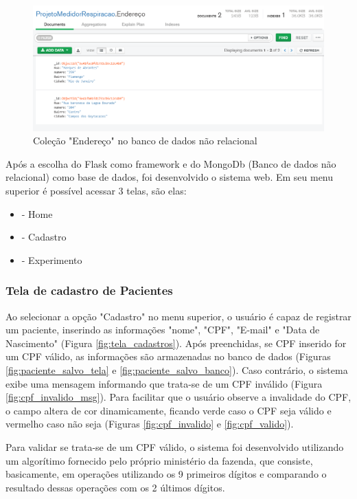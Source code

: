 \begin{figure}[h!]
	\begin{center}
		\includegraphics[width=0.8\linewidth]{images/bd_nao_relacional_Endereco.png}
		\caption{Coleção "Endereço" no banco de dados não relacional}
		\label{fig:bd_nao_relacional_Endereco}
	\end{center}
\end{figure}


Após a escolha do Flask como framework e do MongoDb (Banco de dados não relacional) como base de dados, foi desenvolvido o sistema web. Em seu menu superior é possível acessar 3 telas, são elas:

\begin{itemize}[label=]
	\item - Home
	\item - Cadastro
	\item - Experimento
\end{itemize}

\subsubsection{Tela de cadastro de Pacientes} \label{sec:tela_pacientes}

Ao selecionar a opção "Cadastro" no menu superior, o usuário é capaz de registrar um paciente, inserindo as informações "nome", "CPF", "E-mail" e "Data de Nascimento" (Figura \ref{fig:tela_cadastros}). Após preenchidas, se CPF inserido for um CPF válido, as informações são armazenadas no banco de dados (Figuras \ref{fig:paciente_salvo_tela} e \ref{fig:paciente_salvo_banco}). Caso contrário, o sistema exibe uma mensagem informando que trata-se de um CPF inválido (Figura \ref{fig:cpf_invalido_msg}). Para facilitar que o usuário observe a invalidade do CPF, o campo altera de cor dinamicamente, ficando verde caso o CPF seja válido e vermelho caso não seja (Figuras \ref{fig:cpf_invalido} e \ref{fig:cpf_valido}).


Para validar se trata-se de um CPF válido, o sistema foi desenvolvido utilizando um algorítimo fornecido pelo próprio ministério da fazenda, que consiste, basicamente, em operações utilizando os 9 primeiros dígitos e comparando o resultado dessas operações com os 2 últimos dígitos.

